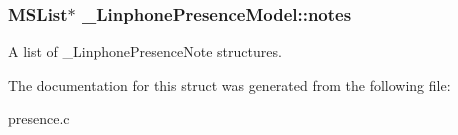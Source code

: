 \subsubsection[{notes}]{\setlength{\rightskip}{0pt plus 5cm}M\-S\-List$\ast$ \-\_\-\-Linphone\-Presence\-Model\-::notes}\label{struct__LinphonePresenceModel_a9b090ce65d8e39834cb45b25d2f59ce4}
A list of \-\_\-\-Linphone\-Presence\-Note structures. 

The documentation for this struct was generated from the following file\-:\begin{DoxyCompactItemize}
\item 
presence.\-c\end{DoxyCompactItemize}
